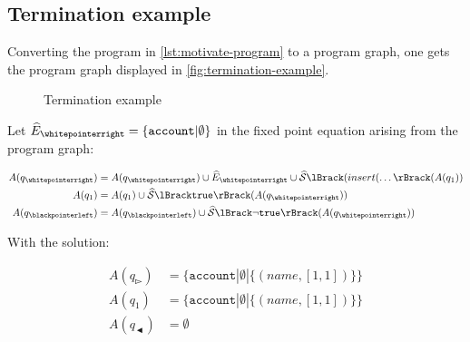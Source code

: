 \subsection{Termination example}

Converting the program in \autoref{lst:motivate-program} to a program graph, one gets the program graph displayed in \autoref{fig:termination-example}.

\begin{figure}
    \centering
    
    \caption{Termination example}
    \label{fig:termination-example}
\end{figure}

Let $\ab{E}_\whitepointerright = \{ \texttt{account} | \emptyset \}$ in the fixed point equation arising from the program graph:

\begin{align}
    A(q_\whitepointerright) &= A(q_\whitepointerright) \cup \ab{E}_\whitepointerright \cup \abssem{(insert(\dots}(A(q_1)) \\
    A(q_1) &= A(q_1) \cup \abssem{\texttt{true}}(A(q_\whitepointerright)) \\
    A(q_\blackpointerleft) &= A(q_\blackpointerleft) \cup \abssem{\neg\texttt{true}}(A(q_\whitepointerright))
\end{align}

With the solution:

\begin{align}
    A(q_\whitepointerright) &= \{ \texttt{account} | \emptyset | \{(name, [1, 1])\}\} \\
    A(q_1) &= \{ \texttt{account} | \emptyset | \{(name, [1, 1])\}\} \\
    A(q_\blackpointerleft) &= \emptyset
\end{align}
